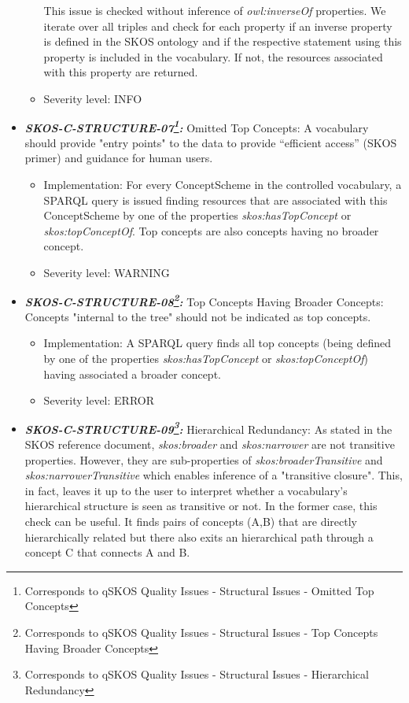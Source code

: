 \documentclass{llncs}
\begin{document}
\begin{itemize}
\begin{itemize}
		This issue is checked without inference of \emph{owl:inverseOf} properties. We iterate over all triples and check for each property if an inverse property is defined in the SKOS ontology and if the respective statement using this property is included in the vocabulary. If not, the resources associated with this property are returned. 
	  \item Severity level: INFO
\end{itemize}
	\item \textbf{{\em SKOS-C-STRUCTURE-07\footnote{Corresponds to qSKOS Quality Issues - Structural Issues - Omitted Top Concepts}:}}
	Omitted Top Concepts:
	A vocabulary should provide "entry points" to the data to provide “efficient access” (SKOS primer) and guidance for human users. 
	\begin{itemize}
		\item Implementation:
		For every ConceptScheme in the controlled vocabulary, a SPARQL query is issued finding resources that are associated with this ConceptScheme by one of the properties \emph{skos:hasTopConcept} or \emph{skos:topConceptOf}. Top concepts are also concepts having no broader concept. 
	  \item Severity level: WARNING
\end{itemize}
	\item \textbf{{\em SKOS-C-STRUCTURE-08\footnote{Corresponds to qSKOS Quality Issues - Structural Issues - Top Concepts Having Broader Concepts}:}}
	Top Concepts Having Broader Concepts:
	Concepts "internal to the tree" should not be indicated as top concepts.
	\begin{itemize}
		\item Implementation:
		A SPARQL query finds all top concepts (being defined by one of the properties \emph{skos:hasTopConcept} or \emph{skos:topConceptOf}) having associated a broader concept. 
	  \item Severity level: ERROR
\end{itemize}
	\item \textbf{{\em SKOS-C-STRUCTURE-09\footnote{Corresponds to qSKOS Quality Issues - Structural Issues - Hierarchical Redundancy}:}}
	Hierarchical Redundancy:
	As stated in the SKOS reference document, \emph{skos:broader} and \emph{skos:narrower} are not transitive properties. However, they are sub-properties of \emph{skos:broaderTransitive} and \emph{skos:narrowerTransitive} which enables inference of a "transitive closure". This, in fact, leaves it up to the user to interpret whether a vocabulary's hierarchical structure is seen as transitive or not. In the former case, this check can be useful. It finds pairs of concepts (A,B) that are directly hierarchically related but there also exits an hierarchical path through a concept C that connects A and B. 

\end{itemize}
\end{document}
